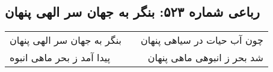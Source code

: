 \begin{center}
\section*{رباعی شماره ۵۲۳: بنگر به جهان سر الهی پنهان}
\label{sec:sh523}
\begin{longtable}{l p{0.5cm} r}
بنگر به جهان سر الهی پنهان
&&
چون آب حیات در سیاهی پنهان
\\
پیدا آمد ز بحر ماهی انبوه
&&
شد بحر ز انبوهی ماهی پنهان
\\
\end{longtable}
\end{center}
